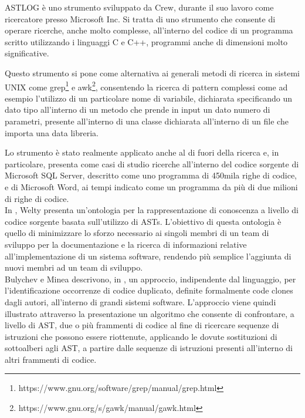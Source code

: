 ASTLOG è uno strumento sviluppato da Crew, durante il suo lavoro come
ricercatore presso Microsoft Inc. Si tratta di uno strumento che consente di
operare ricerche, anche molto complesse, all’interno del codice di un programma
scritto utilizzando i linguaggi C e C++, programmi anche di dimensioni molto
significative. \cite{DBLP:conf/dsl/Crew97}

Questo strumento si pone come alternativa ai generali metodi di ricerca in
sistemi UNIX come
grep\footnote{https://www.gnu.org/software/grep/manual/grep.html} e
awk\footnote{https://www.gnu.org/s/gawk/manual/gawk.html}, consentendo la
ricerca di pattern complessi come ad esempio l’utilizzo di un particolare nome
di variabile, dichiarata specificando un dato tipo all’interno di un metodo che
prende in input un dato numero di parametri, presente all’interno di una classe
dichiarata all’interno di un file che importa una data libreria.

Lo strumento è stato realmente applicato anche al di fuori della ricerca e, in
particolare, \cite{DBLP:conf/dsl/Crew97} presenta come casi di studio ricerche
all’interno del codice sorgente di Microsoft SQL Server, descritto come uno
programma di 450mila righe di codice, e di Microsoft Word, ai tempi indicato
come un programma da più di due milioni di righe di codice.\\

In \cite{DBLP:conf/kbse/Welty97}, Welty presenta un’ontologia per la
rappresentazione di conoscenza a livello di codice sorgente basata sull’utilizzo
di ASTs. L’obiettivo di questa ontologia è quello di minimizzare lo sforzo
necessario ai singoli membri di un team di sviluppo per la documentazione e la
ricerca di informazioni relative all’implementazione di un sistema software,
rendendo più semplice l’aggiunta di nuovi membri ad un team di sviluppo.\\

Bulychev e Minea descrivono, in \cite{peter2008duplicate}, un approccio,
indipendente dal linguaggio, per l’identificazione occorrenze di codice
duplicato, definite formalmente code clones dagli autori, all’interno di grandi
sistemi software. L’approccio viene quindi illustrato attraverso la
presentazione un algoritmo che consente di confrontare, a livello di AST, due o
più frammenti di codice al fine di ricercare sequenze di istruzioni che possono
essere riottenute, applicando le dovute sostituzioni di sottoalberi agli AST, a
partire dalle sequenze di istruzioni presenti all’interno di altri frammenti di
codice.\\

